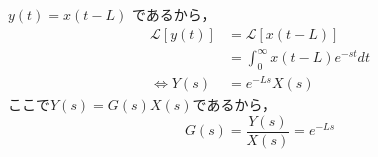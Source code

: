 \documentclass[a4paper,12pt]{article}
\begin{document}
\begin{tcolorbox}[title={[28] \(x(t)[m^3/s]\)は，操作バルブ直後の流量を表し，
    長い配管を通って\\
    \qquad \(L[s]\)後に給水場所に到達したとする．\\
    \qquad このとき，\(x(t)\)から給水量\(y(t)\)までの伝達関数を求めよ．}]
    \quad \(y(t)=x(t-L)\) であるから，
    \begin{align*}
    \mathcal{L} \left[ y(t) \right] 
    &= \mathcal{L} \left[ x(t-L) \right] \\
    &= \int_{0}^{\infty} x(t-L)e^{-st}dt \\
    \Leftrightarrow Y(s) &= e^{-Ls}X(s)
    \end{align*}
    \quad ここで\(Y(s)=G(s)X(s)\)であるから，
    \[
    G(s) = \frac{Y(s)}{X(s)} = e^{-Ls}
    \]
\end{tcolorbox}
\newpage
\end{document}
